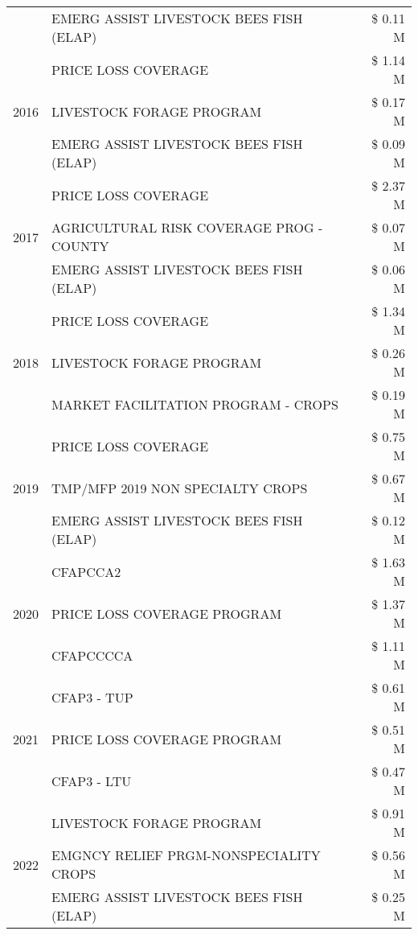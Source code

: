 \begin{tabular}{llr}
 & EMERG ASSIST LIVESTOCK BEES FISH (ELAP) & \$ 0.11 M \\
\cline{1-3}
\multirow[t]{3}{*}{2016} & PRICE LOSS COVERAGE & \$ 1.14 M \\
 & LIVESTOCK FORAGE PROGRAM & \$ 0.17 M \\
 & EMERG ASSIST LIVESTOCK BEES FISH (ELAP) & \$ 0.09 M \\
\cline{1-3}
\multirow[t]{3}{*}{2017} & PRICE LOSS COVERAGE & \$ 2.37 M \\
 & AGRICULTURAL RISK COVERAGE PROG - COUNTY & \$ 0.07 M \\
 & EMERG ASSIST LIVESTOCK BEES FISH (ELAP) & \$ 0.06 M \\
\cline{1-3}
\multirow[t]{3}{*}{2018} & PRICE LOSS COVERAGE & \$ 1.34 M \\
 & LIVESTOCK FORAGE PROGRAM & \$ 0.26 M \\
 & MARKET FACILITATION PROGRAM - CROPS & \$ 0.19 M \\
\cline{1-3}
\multirow[t]{3}{*}{2019} & PRICE LOSS COVERAGE & \$ 0.75 M \\
 & TMP/MFP 2019 NON SPECIALTY CROPS & \$ 0.67 M \\
 & EMERG ASSIST LIVESTOCK BEES FISH (ELAP) & \$ 0.12 M \\
\cline{1-3}
\multirow[t]{3}{*}{2020} & CFAPCCA2 & \$ 1.63 M \\
 & PRICE LOSS COVERAGE PROGRAM & \$ 1.37 M \\
 & CFAPCCCCA & \$ 1.11 M \\
\cline{1-3}
\multirow[t]{3}{*}{2021} & CFAP3 - TUP & \$ 0.61 M \\
 & PRICE LOSS COVERAGE PROGRAM & \$ 0.51 M \\
 & CFAP3 - LTU & \$ 0.47 M \\
\cline{1-3}
\multirow[t]{3}{*}{2022} & LIVESTOCK FORAGE PROGRAM & \$ 0.91 M \\
 & EMGNCY RELIEF PRGM-NONSPECIALITY CROPS & \$ 0.56 M \\
 & EMERG ASSIST LIVESTOCK BEES FISH (ELAP) & \$ 0.25 M \\
\cline{1-3}
\bottomrule
\end{tabular}
